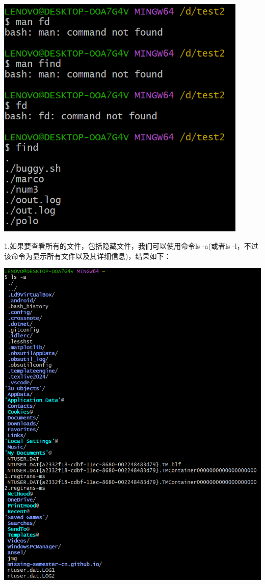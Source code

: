 \documentclass[UTF8,a4paper]{ctexart}
\begin{document}
\begin{sloppypar}
	\includegraphics[width = 12cm]{0}
	
	1.如果要查看所有的文件，包括隐藏文件，我们可以使用命令ls -a(或者ls -l，不过该命令为显示所有文件以及其详细信息)，结果如下：
		
	\includegraphics[width = 16cm]{1}


\end{sloppypar}
\end{document}
